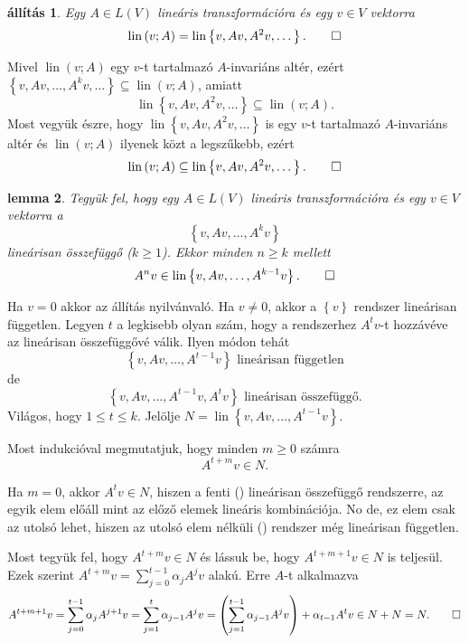 \documentclass[9pt, a4paper, showtrims]{memoir}
\makeatletter
\renewenvironment{proof}[1][\proofname]
    {\par\pushQED{\qed}%
    \normalfont \topsep6\p@\@plus6\p@\relax
    \trivlist
    \item[\hskip\labelsep
        \itshape
    #1\@addpunct{:}]\ignorespaces}
    {\popQED\endtrivlist\@endpefalse}
\theoremstyle{plain}
\newtheorem{proposition}{állítás}[chapter]
\newtheorem{lemma}[proposition]{lemma}
\theoremstyle{remark}
\theoremstyle{definition}
\DeclareMathOperator{\lin}{lin}
\makeatother
\begin{document}
\begin{proposition}
	Egy $A\in L\left( V \right)$ lineáris transzformációra és egy $v\in V$ vektorra
	\[
		\lin\left( v;A \right)
		=
		\lin\left\{ v,Av,A^2v,\dots \right\}.\qedhere
	\]
\end{proposition}
\begin{proof}
	Mivel $\lin\left( v;A \right)$ egy $v$-t tartalmazó $A$-invariáns altér,
	ezért $\left\{ v,Av,\ldots,A^kv,\dots \right\}\subseteq \lin\left( v;A \right)$,
	amiatt
	\[
		\lin\left\{ v,Av,A^2v,\dots \right\}
		\subseteq
		\lin\left( v;A \right).
	\]
	Most vegyük észre, hogy
	\begin{math}
		\lin\left\{ v,Av,A^2v,\dots \right\}
	\end{math}
	is egy $v$-t tartalmazó $A$-invariáns altér és $\lin\left( v;A \right)$ ilyenek közt a legszűkebb, ezért
	\[
		\lin\left( v;A \right)
		\subseteq
		\lin\left\{ v,Av,A^2v,\dots \right\}.\qedhere
	\]
\end{proof}
\begin{lemma}
	Tegyük fel, hogy egy $A\in L\left( V \right)$ lineáris transzformációra és egy
	$v\in V$ vektorra a
	\[
		\left\{ v,Av,\ldots,A^kv \right\}
	\]
	lineárisan összefüggő ($k\geq 1$).
	Ekkor minden $n\geq k$ mellett
	\[
		A^nv\in\lin\left\{ v,Av,\ldots,A^{k-1}v \right\}.\qedhere
	\]
	\label{le:of}
\end{lemma}
\begin{proof}
	Ha $v=0$ akkor az állítás nyilvánvaló.
	Ha $v\neq 0$, akkor a $\left\{ v \right\}$ rendszer lineárisan független.
	Legyen $t$ a legkisebb olyan szám, hogy a rendszerhez $A^tv$-t hozzávéve az lineárisan összefüggővé válik.
	Ilyen módon tehát
	\[
		\left\{ v,Av,\ldots,A^{t-1}v \right\} \text{ lineárisan független}\tag{\dag}
	\]
	de
	\[
		\left\{ v,Av,\ldots,A^{t-1}v, A^tv \right\} \text{ lineárisan összefüggő.}\tag{\ddag}
	\]
	Világos, hogy $1\leq t\leq k$.
	Jelölje $N=\lin\left\{ v, Av,\ldots,A^{t-1}v \right\}$.

	Most indukcióval megmutatjuk, hogy minden $m\geq 0$ számra
	\[
		A^{t+m}v\in N.
	\]

	Ha $m=0$, akkor $A^tv\in N$, hiszen a fenti (\ddag) lineárisan összefüggő rendszerre,
	az egyik elem előáll mint az előző elemek lineáris kombinációja.
	No de, ez elem csak az utolsó lehet,
	hiszen az utolsó elem nélküli (\dag) rendszer még lineárisan független.

	Most tegyük fel, hogy $A^{t+m}v\in N$ és lássuk be, hogy $A^{t+m+1}v\in N$ is teljesül.
	Ezek szerint
	\begin{math}
		A^{t+m}v=\sum_{j=0}^{t-1}\alpha_jA^jv
	\end{math}
	alakú. Erre $A$-t alkalmazva
	\begin{displaymath}
		A^{t+m+1}v
		=
		\sum_{j=0}^{t-1}\alpha_jA^{j+1}v
		=
		\sum_{j=1}^{t}\alpha_{j-1}A^{j}v
		=
		\left( \sum_{j=1}^{t-1}\alpha_{ j-1}A^{j}v \right)+\alpha_{t-1}A^tv\in N+N=N.\qedhere
	\end{displaymath}
\end{proof}
\end{document}
